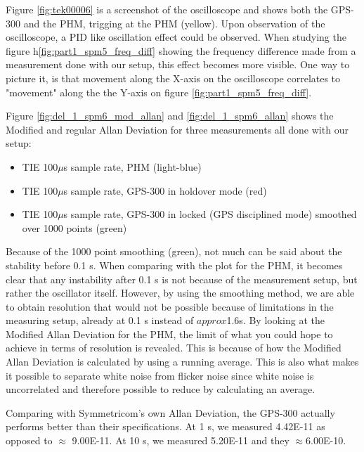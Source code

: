 \documentclass[11pt,english,a4paper]{article}
\begin{document}
Figure \ref{fig:tek00006} is a screenshot of the oscilloscope and shows both the GPS-300 and the PHM, trigging at the PHM (yellow). Upon observation of the oscilloscope, a PID like oscillation effect could be observed. When studying the figure h\ref{fig:part1_spm5_freq_diff} showing the frequency difference made from a measurement done with our setup, this effect becomes more visible. One way to picture it, is that movement along the X-axis on the oscilloscope correlates to "movement" along the the Y-axis on figure \ref{fig:part1_spm5_freq_diff}. 


\newpage
Figure \ref{fig:del_1_spm6_mod_allan} and \ref{fig:del_1_spm6_allan} shows the Modified and regular Allan Deviation for three measurements all done with our setup:
\begin{itemize}
  \item TIE 100$\mu$s sample rate, PHM (light-blue)
  \item TIE 100$\mu$s sample rate, GPS-300 in holdover mode (red)
  \item TIE 100$\mu$s sample rate, GPS-300 in locked (GPS disciplined mode) smoothed over 1000 points (green)
\end{itemize}
Because of the 1000 point smoothing (green), not much can be said about the stability before 0.1 s. When comparing with the plot for the PHM, it becomes clear that any instability after 0.1 s is not because of the measurement setup, but rather the oscillator itself. However, by using the smoothing method, we are able to obtain resolution that would not be possible because of limitations in the measuring setup, already at 0.1 s instead of $approx$1.6s. By looking at the Modified Allan Deviation for the PHM, the limit of what you could hope to achieve in terms of resolution is revealed. This is because of how the Modified Allan Deviation is calculated by using a running average. This is also what makes it possible to separate white noise from flicker noise since white noise is uncorrelated and therefore possible to reduce by calculating an average.   

Comparing with Symmetricom's own Allan Deviation, the GPS-300 actually performs better than their specifications. At 1 s, we measured 4.42E-11 as opposed to $\approx$ 9.00E-11. At 10 s, we measured 5.20E-11 and they $\approx$6.00E-10.
\end{document}
